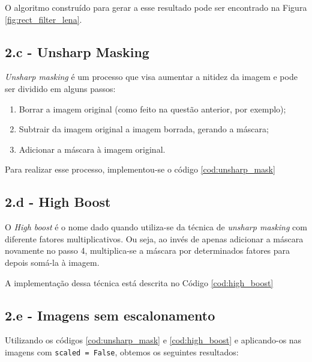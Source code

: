 \documentclass{article}
\begin{document}
O algoritmo construído para gerar a esse resultado pode ser encontrado na Figura \ref{fig:rect_filter_lena}.

\subsection*{2.c - Unsharp Masking}

\textit{Unsharp masking} é um processo que visa aumentar a nitidez da imagem e pode ser dividido em alguns passos:

\begin{enumerate}
	\item Borrar a imagem original (como feito na questão anterior, por exemplo);
	\item Subtrair da imagem original a imagem borrada, gerando a máscara;
	\item Adicionar a máscara à imagem original.
\end{enumerate}

Para realizar esse processo, implementou-se o código \ref{cod:unsharp_mask}

\subsection*{2.d - High Boost}
O \textit{High boost} é o nome dado quando utiliza-se da técnica de \textit{unsharp masking} com diferente fatores multiplicativos. Ou seja, ao invés de apenas adicionar a máscara novamente no passo 4, multiplica-se a máscara por determinados fatores para depois somá-la à imagem.

A implementação dessa técnica está descrita no Código \ref{cod:high_boost}

\subsection*{2.e - Imagens sem escalonamento}
Utilizando os códigos \ref{cod:unsharp_mask} e \ref{cod:high_boost} e aplicando-os nas imagens com \lstinline{scaled = False}, obtemos os seguintes resultados:
\end{document}
